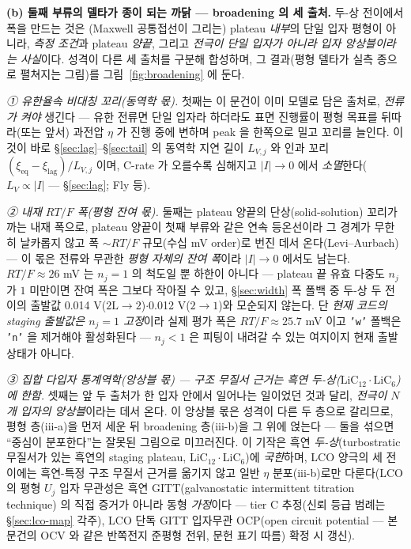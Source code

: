 \documentclass[11pt,a4paper]{article}
\newcommand{\eq}{\mathrm{eq}}
\newcommand{\code}[1]{\texttt{#1}}
\begin{document}
\textbf{(b) 둘째 부류의 델타가 종이 되는 까닭 — broadening 의 세 출처.} 두-상 전이에서 폭을 만드는 것은 (Maxwell
공통접선이 그리는) plateau \emph{내부}의 단일 입자 평형이 아니라, \emph{측정 조건}과 plateau \emph{양끝}, 그리고
\emph{전극이 단일 입자가 아니라 입자 앙상블이라는 사실}이다. 성격이 다른 세 출처를 구분해 합성하며, 그 결과(평형 델타가
실측 종으로 펼쳐지는 그림)를 그림~\ref{fig:broadening} 에 둔다.

\emph{① 유한율속 비대칭 꼬리(동역학 몫).} 첫째는 이 문건이 이미 모델로 담은 출처로, \emph{전류가 켜야} 생긴다 — 유한
전류면 단일 입자라 하더라도 표면 진행률이 평형 목표를 뒤따라(또는 앞서) 과전압 $\eta$ 가 진행 중에 변하며 peak 을 한쪽으로
밀고 꼬리를 늘인다. 이것이 바로 \S\ref{sec:lag}--\S\ref{sec:tail} 의 동역학 지연 길이 $L_{V,j}$ 와 인과 꼬리
$(\xi_\eq-\xi_\mathrm{lag})/L_{V,j}$ 이며, C-rate 가 오를수록 심해지고 $|I|\!\to\!0$ 에서
\emph{소멸}한다($L_V\propto|I|$ — \S\ref{sec:lag}; Fly 등\cite{fly2020}).

\emph{② 내재 $RT/F$ 폭(평형 잔여 몫).} 둘째는 plateau 양끝의 단상(solid-solution) 꼬리가 까는 내재 폭으로, plateau
양끝이 첫째 부류와 같은 연속 등온선이라 그 경계가 무한히 날카롭지 않고 폭 $\sim RT/F$ 규모(수십 mV order)로 번진 데서
온다(Levi--Aurbach\cite{leviaurbach1999}) — 이 몫은 전류와 무관한 \emph{평형 자체의 잔여 폭}이라 $|I|\!\to\!0$ 에서도
남는다. $RT/F\!\approx\!26$ mV 는 $n_j{=}1$ 의 척도일 뿐 하한이 아니다 — plateau 끝 유효 다중도 $n_j$ 가
$1$ 미만이면 잔여 폭은 그보다 작아질 수 있고, \S\ref{sec:width} 폭 폴백 중 두-상 두 전이의 출발값
0.014 V($2\mathrm L\!\to\!2$)$\cdot$0.012 V($2\!\to\!1$)와 모순되지 않는다. 단 \emph{현재 코드의 staging
출발값은 $n_j{=}1$ 고정}이라 실제 평가 폭은 $RT/F\!\approx\!25.7$ mV 이고 \code{'w'} 폴백은 \code{'n'} 을
제거해야 활성화된다 — $n_j\!<\!1$ 은 피팅이 내려갈 수 있는 여지이지 현재 출발 상태가 아니다.

\emph{③ 집합 다입자 통계역학(앙상블 몫) — 구조 무질서 근거는 흑연 두-상($\mathrm{LiC_{12}}\cdot\mathrm{LiC_6}$)에 한함.} 셋째는 앞 두 출처가
한 입자 안에서 일어나는 일이었던 것과 달리, \emph{전극이 $N$ 개 입자의 앙상블}이라는 데서 온다. 이 앙상블 몫은 성격이
다른 두 층으로 갈리므로, 평형 층(iii-a)을 먼저 세운 뒤 broadening 층(iii-b)을 그 위에 얹는다 — 둘을 섞으면 ``중심이
분포한다''는 잘못된 그림으로 미끄러진다. 이 기작은 흑연 \emph{두-상}(turbostratic 무질서가 있는 흑연의 staging
plateau, $\mathrm{LiC_{12}}\cdot\mathrm{LiC_6}$)에 \emph{국한}하며, LCO 양극의 세 전이에는 흑연-특정 구조 무질서
근거를 옮기지 않고 일반 $\eta$ 분포(iii-b)로만 다룬다(LCO 의 평형 $U_j$ 입자 무관성은 흑연
GITT(galvanostatic intermittent titration technique)\cite{park2021} 의 직접 증거가 아니라 동형
\emph{가정}이다 — tier C 추정(신뢰 등급 범례는 \S\ref{sec:lco-map} 각주), LCO 단독 GITT 입자무관 OCP(open
circuit potential — 본 문건의 OCV 와 같은 반쪽전지 준평형 전위, 문헌 표기 따름) 확정 시 갱신).
\end{document}
